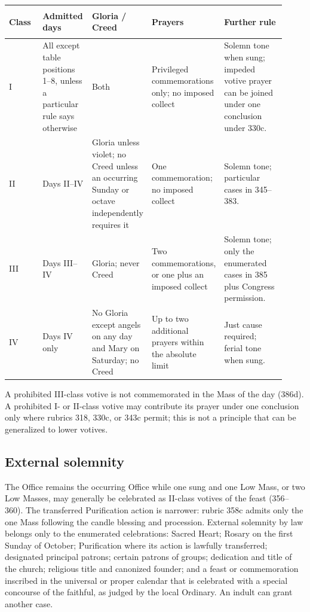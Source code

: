 \begin{longtable}{>{\bfseries\raggedright\arraybackslash}p{0.13\linewidth}>{\raggedright\arraybackslash}p{0.18\linewidth}>{\raggedright\arraybackslash}p{0.17\linewidth}>{\raggedright\arraybackslash}p{0.19\linewidth}>{\raggedright\arraybackslash}p{0.25\linewidth}}
\toprule
Class & Admitted days & Gloria / Creed & Prayers & Further rule\\
\midrule
\endhead
I & All except table positions 1--8, unless a particular rule says otherwise & Both & Privileged commemorations only; no imposed collect & Solemn tone when sung; impeded votive prayer can be joined under one conclusion under 330c.\\
II & Days II--IV & Gloria unless violet; no Creed unless an occurring Sunday or octave independently requires it & One commemoration; no imposed collect & Solemn tone; particular cases in 345--383.\\
III & Days III--IV & Gloria; never Creed & Two commemorations, or one plus an imposed collect & Solemn tone; only the enumerated cases in 385 plus Congress permission.\\
IV & Days IV only & No Gloria except angels on any day and Mary on Saturday; no Creed & Up to two additional prayers within the absolute limit & Just cause required; ferial tone when sung.\\
\bottomrule
\end{longtable}


A prohibited III-class votive is not commemorated in the Mass of the day (386d). A prohibited I- or II-class votive may contribute its prayer under one conclusion only where rubrics 318, 330c, or 343c permit; this is not a principle that can be generalized to lower votives.

\subsection{External solemnity}

The Office remains the occurring Office while one sung and one Low Mass, or two Low Masses, may generally be celebrated as II-class votives of the feast (356--360). The transferred Purification action is narrower: rubric 358c admits only the one Mass following the candle blessing and procession. External solemnity by law belongs only to the enumerated celebrations: Sacred Heart; Rosary on the first Sunday of October; Purification where its action is lawfully transferred; designated principal patrons; certain patrons of groups; dedication and title of the church; religious title and canonized founder; and a feast or commemoration inscribed in the universal or proper calendar that is celebrated with a special concourse of the faithful, as judged by the local Ordinary. An indult can grant another case.

